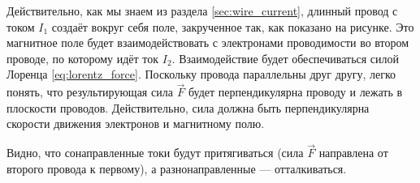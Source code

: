 \documentclass[a4paper,12pt]{article}
\begin{document}
Действительно, как мы знаем из раздела \ref{sec:wire_current}, длинный
провод с током $I_1$ создаёт вокруг себя поле, закрученное так, как
показано на рисунке. Это магнитное поле будет взаимодействовать с
электронами проводимости во втором проводе, по которому идёт ток
$I_2$. Взаимодействие будет обеспечиваться силой Лоренца
\eqref{eq:lorentz_force}. Поскольку провода параллельны друг другу,
легко понять, что результирующая сила $\vec{F}$ будет перпендикулярна
проводу и лежать в плоскости проводов. Действительно, сила должна быть
перпендикулярна скорости движения электронов и магнитному полю.

Видно, что сонаправленные токи будут притягиваться (сила $\vec{F}$
направлена от второго провода к первому), а разнонаправленные ---
отталкиваться. 
\end{document}
